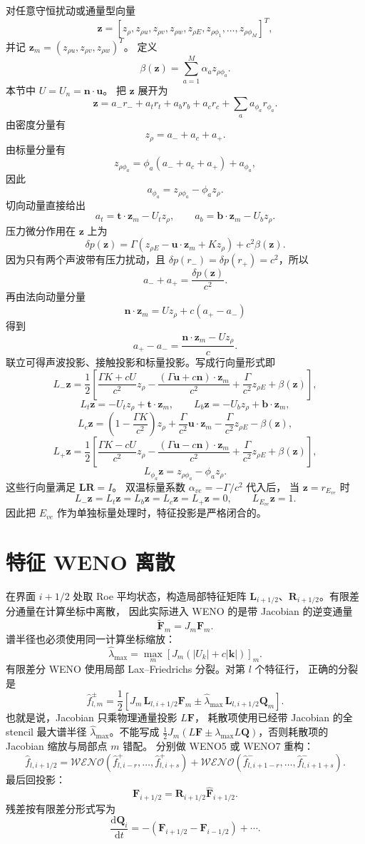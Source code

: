 \documentclass[11pt,a4paper,fontset=fandol]{ctexart}
\newcommand{\dd}{\mathrm{d}}
\newcommand{\ve}{ve}
\newcommand{\kk}{\bm{k}}
\newcommand{\nn}{\bm{n}}
\newcommand{\uu}{\bm{u}}
\newcommand{\zz}{\bm{z}}
\newcommand{\QQ}{\bm{Q}}
\newcommand{\FF}{\bm{F}}
\newcommand{\RR}{\bm{R}}
\newcommand{\LL}{\bm{L}}
\newcommand{\Gammaone}{\Gamma}
\begin{document}
对任意守恒扰动或通量型向量
\[
\zz=[z_\rho,z_{\rho u},z_{\rho v},z_{\rho w},z_{\rho E},
z_{\rho\phi_1},\ldots,z_{\rho\phi_M}]^T,
\]
并记 \(\zz_m=(z_{\rho u},z_{\rho v},z_{\rho w})^T\)。
定义
\[
\beta(\zz)=\sum_{a=1}^{M}\alpha_a z_{\rho\phi_a}.
\]
本节中 \(U=U_n=\nn\cdot\uu\)。
把 \(\zz\) 展开为
\[
\zz=a_-r_-+a_t r_t+a_b r_b+a_c r_c+\sum_a a_{\phi_a}r_{\phi_a}.
\]
由密度分量有
\[
z_\rho=a_-+a_c+a_+ .
\]
由标量分量有
\[
z_{\rho\phi_a}=\phi_a(a_-+a_c+a_+)+a_{\phi_a},
\]
因此
\[
\boxed{a_{\phi_a}=z_{\rho\phi_a}-\phi_a z_\rho}.
\]
切向动量直接给出
\[
\boxed{a_t=\bm{t}\cdot\zz_m-U_tz_\rho},\qquad
\boxed{a_b=\bm{b}\cdot\zz_m-U_bz_\rho}.
\]
压力微分作用在 \(\zz\) 上为
\[
\delta p(\zz)
=\Gammaone(z_{\rho E}-\uu\cdot\zz_m+Kz_\rho)
+c^2\beta(\zz).
\]
因为只有两个声波带有压力扰动，且
\(\delta p(r_-)=\delta p(r_+)=c^2\)，所以
\[
a_-+a_+=\frac{\delta p(\zz)}{c^2}.
\]
再由法向动量分量
\[
\nn\cdot\zz_m=Uz_\rho+c(a_+-a_-)
\]
得到
\[
a_+-a_-=\frac{\nn\cdot\zz_m-Uz_\rho}{c}.
\]
联立可得声波投影、接触投影和标量投影。写成行向量形式即
\[
L_-\zz=
\frac{1}{2}\left[
\frac{\Gammaone K+cU}{c^2}z_\rho
-\frac{(\Gammaone\uu+c\nn)\cdot\zz_m}{c^2}
+\frac{\Gammaone}{c^2}z_{\rho E}
+\beta(\zz)\right],
\]
\[
L_t\zz=-U_tz_\rho+\bm{t}\cdot\zz_m,\qquad
L_b\zz=-U_bz_\rho+\bm{b}\cdot\zz_m,
\]
\[
L_c\zz=
\left(1-\frac{\Gammaone K}{c^2}\right)z_\rho
+\frac{\Gammaone}{c^2}\uu\cdot\zz_m
-\frac{\Gammaone}{c^2}z_{\rho E}
-\beta(\zz),
\]
\[
L_+\zz=
\frac{1}{2}\left[
\frac{\Gammaone K-cU}{c^2}z_\rho
-\frac{(\Gammaone\uu-c\nn)\cdot\zz_m}{c^2}
+\frac{\Gammaone}{c^2}z_{\rho E}
+\beta(\zz)\right],
\]
\[
L_{\phi_a}\zz=z_{\rho\phi_a}-\phi_a z_\rho.
\]
这些行向量满足 \(\LL\RR=I\)。
双温标量系数 \(\alpha_{\ve}=-\Gammaone/c^2\) 代入后，
当 \(\zz=r_{E_{\ve}}\) 时
\[
L_-\zz=L_t\zz=L_b\zz=L_c\zz=L_+\zz=0,\qquad
L_{E_{\ve}}\zz=1.
\]
因此把 \(E_{\ve}\) 作为单独标量处理时，特征投影是严格闭合的。

\section{特征 WENO 离散}

在界面 \(i+1/2\) 处取 Roe 平均状态，构造局部特征矩阵
\(\LL_{i+1/2}\)、\(\RR_{i+1/2}\)。有限差分通量在计算坐标中离散，
因此实际进入 WENO 的是带 Jacobian 的逆变通量
\[
\widetilde{\FF}_m=J_m\FF_m .
\]
谱半径也必须使用同一计算坐标缩放：
\[
\widehat{\lambda}_{\max}
=\max_m\left[J_m\left(|U_k|+c|\kk|\right)\right]_m .
\]
有限差分 WENO 使用局部 Lax--Friedrichs 分裂。对第 \(l\) 个特征行，
正确的分裂是
\[
\widehat{f}^{\pm}_{l,m}
=\frac{1}{2}\left[
J_m\,\LL_{l,i+1/2}\FF_m
\pm \widehat{\lambda}_{\max}\,\LL_{l,i+1/2}\QQ_m
\right].
\]
也就是说，Jacobian 只乘物理通量投影 \(L\FF\)，
耗散项使用已经带 Jacobian 的全 stencil 最大谱半径
\(\widehat{\lambda}_{\max}\)。不能写成
\(\frac12 J_m(L\FF\pm\lambda_{\max}L\QQ)\)，否则耗散项的
Jacobian 缩放与局部点 \(m\) 错配。
分别做 WENO5 或 WENO7 重构：
\[
\hat{f}_{l,i+1/2}
=\mathcal{WENO}(\widehat{f}^{+}_{l,i-r},\ldots,\widehat{f}^{+}_{l,i+s})
+\mathcal{WENO}(\widehat{f}^{-}_{l,i+1-r},\ldots,\widehat{f}^{-}_{l,i+1+s}).
\]
最后回投影：
\[
\FF_{i+1/2}=\RR_{i+1/2}\hat{\FF}_{i+1/2}.
\]
残差按有限差分形式写为
\[
\frac{\dd \QQ_i}{\dd t}
=-\left(\FF_{i+1/2}-\FF_{i-1/2}\right)+\cdots .
\]
\end{document}
